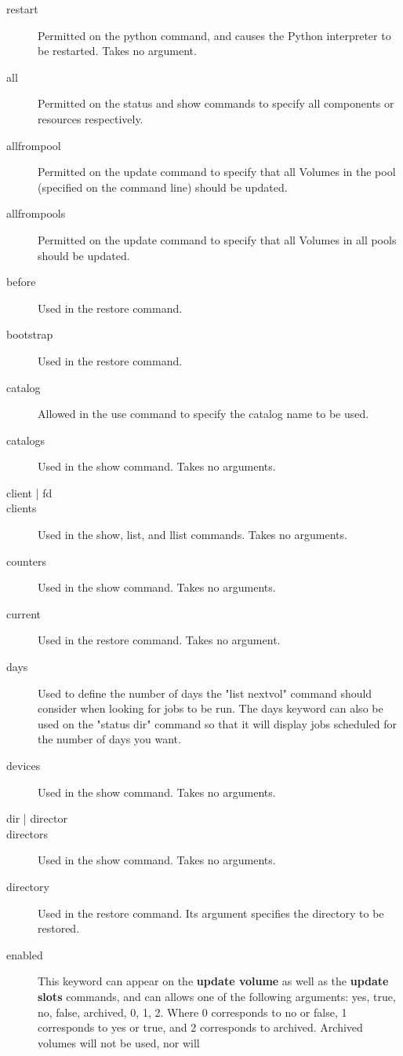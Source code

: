 \begin{description}
\item [restart]
  Permitted on the python command, and causes the Python 
  interpreter to be restarted. Takes no argument.
\item [all]
  Permitted on the status and show commands to specify all components or
  resources respectively.
\item [allfrompool]
  Permitted on the update command to specify that all Volumes in the
  pool (specified on the command line) should be updated.
\item [allfrompools]
  Permitted on the update command to specify that all Volumes in all
  pools should be updated.
\item [before]
  Used in the restore command.
\item [bootstrap]
  Used in the restore command.
\item [catalog]
  Allowed in the use command to specify the catalog name
  to be used.
\item [catalogs]
  Used in the show command. Takes no arguments.
\item [client | fd]
\item [clients]
  Used in the show, list, and llist commands. Takes no arguments.
\item [counters]
  Used in the show command. Takes no arguments.
\item [current]
  Used in the restore command. Takes no argument.
\item [days]
  Used to define the number of days the "list nextvol" command
  should consider when looking for jobs to be run.  The days keyword
  can also be used on the "status dir" command so that it will display
  jobs scheduled for the number of days you want.
\item [devices]
  Used in the show command. Takes no arguments.
\item [dir | director]
\item [directors]
  Used in the show command. Takes no arguments.
\item [directory]
  Used in the restore command. Its argument specifies the directory
  to be restored. 
\item [enabled]
  This keyword can appear on the {\bf update volume} as well
  as the {\bf update slots} commands, and can 
  allows one of the following arguments: yes, true, no, false, archived,
  0, 1, 2.  Where 0 corresponds to no or false, 1 corresponds to yes or true, and
  2 corresponds to archived.  Archived volumes will not be used, nor will

\end{description}
